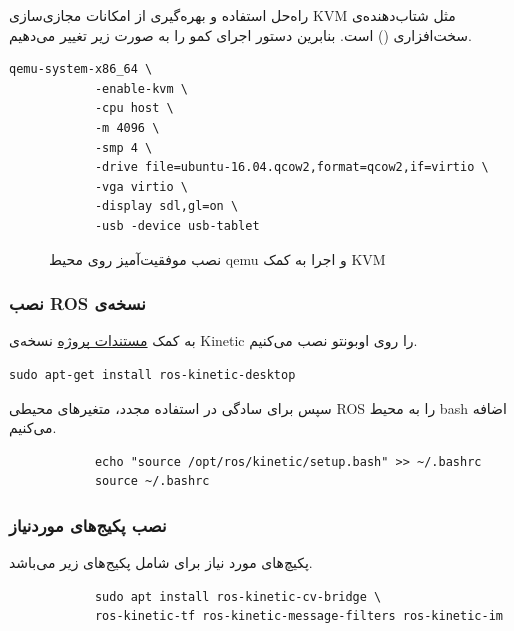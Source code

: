 \documentclass[11pt, a4paper]{article}
\begin{document}
	راه‌حل استفاده و بهره‌گیری از امکانات مجازی‌سازی KVM مثل شتاب‌دهنده‌ی سخت‌افزاری 
	()
	است. بنابرین دستور اجرای کمو را به صورت زیر تغییر می‌دهیم.
	\begin{LTR}
		\begin{verbatim}qemu-system-x86_64 \
			-enable-kvm \
			-cpu host \
			-m 4096 \
			-smp 4 \
			-drive file=ubuntu-16.04.qcow2,format=qcow2,if=virtio \
			-vga virtio \
			-display sdl,gl=on \
			-usb -device usb-tablet
		\end{verbatim}
	\end{LTR}
	
	\begin{figure}[h]
		\centering
		\caption[اوبونتو نصب شده روی محیط مجازی]{
			نصب موفقیت‌آمیز
			 روی محیط qemu و اجرا به کمک KVM
		}
		\label{fig:ubuntu-kvm}
	\end{figure}
	
	\subsubsection{نصب \Gls{ROS} نسخه‌ی }
	به کمک 
	\href{https://wiki.ros.org/kinetic/Installation/Ubuntu}{مستندات پروژه}
	نسخه‌ی Kinetic را روی اوبونتو نصب می‌کنیم.
	
	\begin{LTR}
		\begin{verbatim}sudo apt-get install ros-kinetic-desktop
		\end{verbatim}
	\end{LTR}
	سپس برای سادگی در استفاده مجدد، متغیرهای محیطی 
	\gls{ROS}
	را به محیط bash اضافه می‌کنیم.
	\begin{LTR}
		\begin{verbatim}
			echo "source /opt/ros/kinetic/setup.bash" >> ~/.bashrc
			source ~/.bashrc
		\end{verbatim}
	\end{LTR}
	
	\subsubsection{نصب پکیج‌های موردنیاز 
		}
	پکیچ‌های مورد نیاز برای  شامل پکیج‌های زیر می‌باشد.
	\begin{LTR}
		\begin{verbatim}
			sudo apt install ros-kinetic-cv-bridge \
			ros-kinetic-tf ros-kinetic-message-filters ros-kinetic-im
		\end{verbatim}
	\end{LTR}
	
\end{document}
